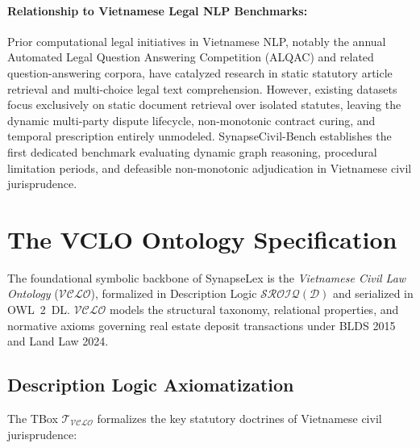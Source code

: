 \documentclass[11pt,a4paper]{article}
\begin{document}
\paragraph{Relationship to Vietnamese Legal NLP Benchmarks:} Prior computational legal initiatives in Vietnamese NLP, notably the annual Automated Legal Question Answering Competition (ALQAC) \citep{nguyen2021alqac, do2025alqac} and related question-answering corpora, have catalyzed research in static statutory article retrieval and multi-choice legal text comprehension. However, existing datasets focus exclusively on static document retrieval over isolated statutes, leaving the dynamic multi-party dispute lifecycle, non-monotonic contract curing, and temporal prescription entirely unmodeled. SynapseCivil-Bench establishes the first dedicated benchmark evaluating dynamic graph reasoning, procedural limitation periods, and defeasible non-monotonic adjudication in Vietnamese civil jurisprudence.

\section{The VCLO Ontology Specification}
\label{sec:ontology}
The foundational symbolic backbone of SynapseLex is the \textit{Vietnamese Civil Law Ontology} ($\mathcal{VCLO}$), formalized in Description Logic $\mathcal{SROIQ}(\mathcal{D})$ and serialized in OWL~2~DL. $\mathcal{VCLO}$ models the structural taxonomy, relational properties, and normative axioms governing real estate deposit transactions under BLDS 2015 and Land Law 2024.

\subsection{Description Logic Axiomatization}
The TBox $\mathcal{T}_{\mathcal{VCLO}}$ formalizes the key statutory doctrines of Vietnamese civil jurisprudence:
\end{document}
